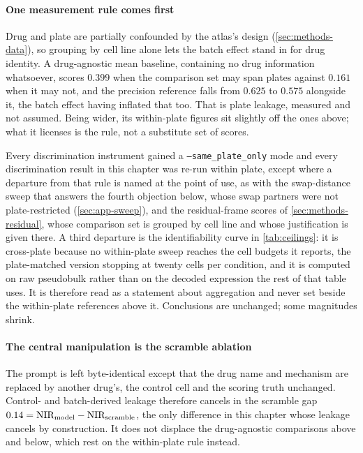 \paragraph{One measurement rule comes first} Drug and plate are partially
confounded by the atlas's design
(\cref{sec:methods-data}), so grouping by cell line alone lets the batch effect
stand in for drug identity. A drug-agnostic mean baseline, containing no drug
information whatsoever, scores $0.399$ when the comparison set may span plates
against $0.161$ when it may not, and the precision reference falls from $0.625$
to $0.575$ alongside it, the batch
effect having inflated that too. That is plate leakage, measured and not
assumed. Being wider, its within-plate figures sit slightly off the ones above;
what it licenses is the rule, not a substitute set of scores.

\begin{scopelimit}
Every discrimination instrument gained a \texttt{--same\_plate\_only} mode and
every discrimination result in this chapter was re-run within plate, except
where a departure from that rule is named at the point of use, as with the
swap-distance sweep that answers the fourth objection below, whose swap partners
were not plate-restricted (\cref{sec:app-sweep}), and the residual-frame scores
of \cref{sec:methods-residual}, whose comparison set is grouped by cell line and
whose justification is given there. A third departure is the identifiability
curve in \cref{tab:ceilings}: it is cross-plate because no within-plate sweep
reaches the cell budgets it reports, the plate-matched version stopping at
twenty cells per condition, and it is computed on raw pseudobulk rather than on
the decoded expression the rest of that table uses. It is therefore read as a
statement about aggregation and never set beside the within-plate references
above it. Conclusions are unchanged; some magnitudes shrink.
\end{scopelimit}

\paragraph{The central manipulation is the scramble ablation} The prompt is left
byte-identical except that the drug name and mechanism are replaced by another
drug's, the control cell and the scoring truth unchanged. Control- and batch-derived leakage therefore cancels in
the scramble gap $0.14 = \textrm{NIR}_{\textrm{model}} - \textrm{NIR}_{\textrm{scramble}}$, the
only difference in this chapter whose leakage cancels by construction. It does
not displace the drug-agnostic comparisons above and below, which rest on the
within-plate rule instead.

